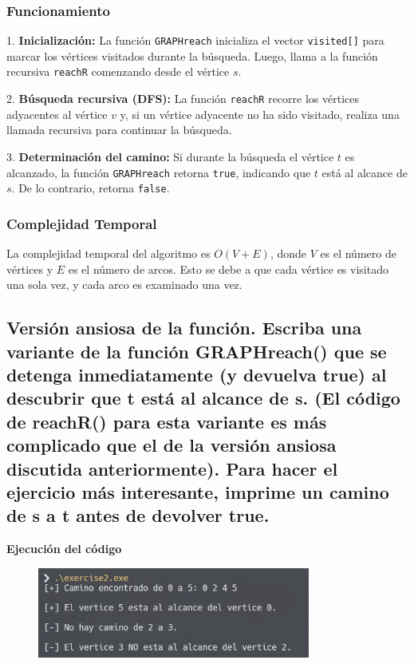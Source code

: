 \documentclass{article}
\begin{document}
        \subsubsection*{Funcionamiento}
           1. \textbf{Inicialización:} La función \texttt{GRAPHreach} inicializa el vector \texttt{visited[]} para marcar los vértices visitados durante la búsqueda. Luego, llama a la función recursiva \texttt{reachR} comenzando desde el vértice \( s \).
   
            2. \textbf{Búsqueda recursiva (DFS):} La función \texttt{reachR} recorre los vértices adyacentes al vértice \( v \) y, si un vértice adyacente no ha sido visitado, realiza una llamada recursiva para continuar la búsqueda.
            
            3. \textbf{Determinación del camino:} Si durante la búsqueda el vértice \( t \) es alcanzado, la función \texttt{GRAPHreach} retorna \texttt{true}, indicando que \( t \) está al alcance de \( s \). De lo contrario, retorna \texttt{false}.

            
        \subsubsection*{Complejidad Temporal}
            La complejidad temporal del algoritmo es \( O(V + E) \), donde \( V \) es el número de vértices y \( E \) es el número de arcos. Esto se debe a que cada vértice es visitado una sola vez, y cada arco es examinado una vez.


    \subsection{Versión ansiosa de la función. Escriba una variante de la función GRAPHreach() que se detenga inmediatamente (y devuelva true) al descubrir que t está al alcance de s. (El código de reachR() para esta variante es más complicado que el de la versión ansiosa discutida anteriormente). Para hacer el ejercicio más interesante, imprime un camino de s a t antes de devolver true.}

        

        \textbf{Ejecución del código}
            \begin{figure}[H]
            	\centering
             	\includegraphics[width=0.8\textwidth,keepaspectratio]{img/exercise2.png}
            \end{figure}
\end{document}
